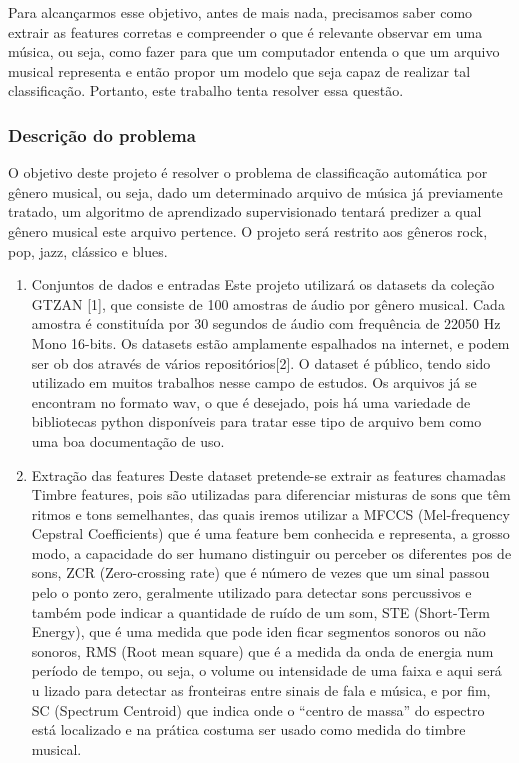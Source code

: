 \documentclass[11pt]{article}
\begin{document}
Para alcançarmos esse objetivo, antes de mais nada, precisamos saber
como extrair as features corretas e compreender o que é relevante
observar em uma música, ou seja, como fazer para que um computador
entenda o que um arquivo musical representa e então propor um modelo que
seja capaz de realizar tal classificação. Portanto, este trabalho tenta
resolver essa questão.

\subsubsection{Descrição do problema}\label{descriuxe7uxe3o-do-problema}

O objetivo deste projeto é resolver o problema de classificação
automática por gênero musical, ou seja, dado um determinado arquivo de
música já previamente tratado, um algoritmo de aprendizado
supervisionado tentará predizer a qual gênero musical este arquivo
pertence. O projeto será restrito aos gêneros rock, pop, jazz, clássico
e blues.

\begin{enumerate}
\def\labelenumi{\arabic{enumi}.}
\item
  Conjuntos de dados e entradas Este projeto utilizará os datasets da
  coleção GTZAN {[}1{]}, que consiste de 100 amostras de áudio por
  gênero musical. Cada amostra é constituída por 30 segundos de áudio
  com frequência de 22050 Hz Mono 16-bits. Os datasets estão amplamente
  espalhados na internet, e podem ser ob dos através de vários
  repositórios{[}2{]}. O dataset é público, tendo sido utilizado em
  muitos trabalhos nesse campo de estudos. Os arquivos já se encontram
  no formato wav, o que é desejado, pois há uma variedade de bibliotecas
  python disponíveis para tratar esse tipo de arquivo bem como uma boa
  documentação de uso.
\item
  Extração das features Deste dataset pretende-se extrair as features
  chamadas Timbre features, pois são utilizadas para diferenciar
  misturas de sons que têm ritmos e tons semelhantes, das quais iremos
  utilizar a MFCCS (Mel-frequency Cepstral Coefficients) que é uma
  feature bem conhecida e representa, a grosso modo, a capacidade do ser
  humano distinguir ou perceber os diferentes pos de sons, ZCR
  (Zero-crossing rate) que é número de vezes que um sinal passou pelo o
  ponto zero, geralmente utilizado para detectar sons percussivos e
  também pode indicar a quantidade de ruído de um som, STE (Short-Term
  Energy), que é uma medida que pode iden ficar segmentos sonoros ou não
  sonoros, RMS (Root mean square) que é a medida da onda de energia num
  período de tempo, ou seja, o volume ou intensidade de uma faixa e aqui
  será u lizado para detectar as fronteiras entre sinais de fala e
  música, e por fim, SC (Spectrum Centroid) que indica onde o ``centro
  de massa'' do espectro está localizado e na prática costuma ser usado
  como medida do timbre musical.
\end{enumerate}
\end{document}

